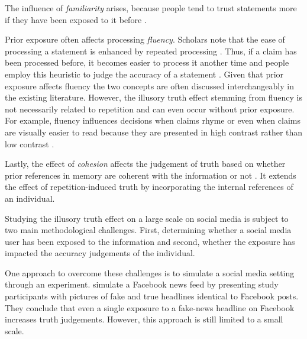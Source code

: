 \documentclass[
10pt, %
a4paper, %
oneside, %
headinclude,footinclude, %
] {book}%
\begin{document}

The influence of \emph{familiarity} arises, because people tend to trust statements more if they have been exposed to it before \citep{dechene2010truth}. 

Prior exposure often affects processing \emph{fluency}. Scholars note that the ease of processing a statement is enhanced by repeated processing \citep{dechene2010truth, wang_illusory_truth}. Thus, if a claim has been processed before, it becomes easier to process it another time and people employ this heuristic to judge the accuracy of a statement \citep{tucker2018social}. Given that prior exposure affects fluency the two concepts are often discussed interchangeably in the existing literature. However, the illusory truth effect stemming from fluency is not necessarily related to repetition and can even occur without prior exposure. For example, fluency influences decisions  when claims rhyme \citep{mcglone2000birds} or even when claims are visually easier to read because they are presented in high contrast rather than low contrast \citep{reber1999effects}.

Lastly, the effect of \emph{cohesion} affects the judgement of truth based on whether prior references in memory are coherent with the information or not \citep{unkelbach2017referential}. It extends the effect of repetition-induced truth by incorporating the internal references of an individual.

Studying the illusory truth effect on a large scale on social media is subject to two main methodological challenges. First, determining whether a social media user has been exposed to the information and second, whether the exposure has impacted the accuracy judgements of the individual.

One approach to overcome these challenges is to simulate a social media setting through an experiment. \cite{pennycook2018prior} simulate a Facebook news feed by presenting study participants with pictures of fake and true headlines identical to Facebook posts. They conclude that even a single exposure to a fake-news headline on Facebook increases truth judgements. However, this approach is still limited to a small scale.
\end{document}
